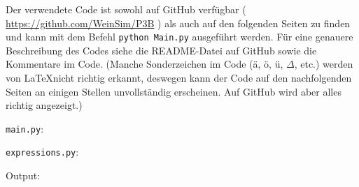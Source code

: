 \documentclass{article}
\newcommand{\githuburl}{
    \url{https://github.com/WeinSim/P3B}
}
\begin{document}
Der verwendete Code ist sowohl auf GitHub verfügbar (\githuburl) als auch auf den
folgenden Seiten zu finden und kann mit dem Befehl \texttt{python Main.py}
ausgeführt werden. Für eine genauere Beschreibung des Codes siehe die README-Datei
auf GitHub sowie die Kommentare im Code.
(Manche Sonderzeichen im Code (ä, ö, ü, $\Delta$, etc.) werden von \LaTeX nicht
richtig erkannt, deswegen kann der Code auf den nachfolgenden Seiten an einigen
Stellen unvollständig erscheinen. Auf GitHub wird aber alles richtig angezeigt.)

\newpage


\verb|main.py|:

\newpage

\verb|expressions.py|:

\newpage

Output:

\end{document}
